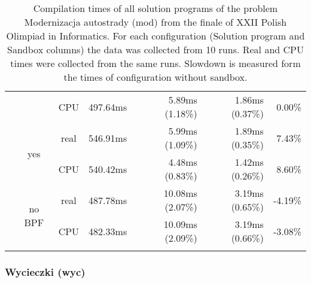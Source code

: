 \documentclass[en]{pracamgr}
\begin{document}
\begin{small}
\begin{longtable}{|l|c|c|r|r|r|r|}
                            &                         & CPU  & 497.64ms & 5.89ms (1.18\%) & 1.86ms (0.37\%) & 0.00\% \\*
                            \cline{2-7}
                            & \multirow{2}{*}{yes}    & real & 546.91ms & 5.99ms (1.09\%) & 1.89ms (0.35\%) & 7.43\% \\*
                            &                         & CPU  & 540.42ms & 4.48ms (0.83\%) & 1.42ms (0.26\%) & 8.60\% \\*
                            \cline{2-7}
                            & \multirow{2}{*}{no BPF} & real & 487.78ms & 10.08ms (2.07\%) & 3.19ms (0.65\%) & -4.19\% \\*
                            &                         & CPU  & 482.33ms & 10.09ms (2.09\%) & 3.19ms (0.66\%) & -3.08\% \\
\hline
\caption{Compilation times of all solution programs of the problem Modernizacja autostrady (mod) from the finale of XXII Polish Olimpiad in Informatics. For each configuration (Solution program and Sandbox columns) the data was collected from 10 runs. Real and CPU times were collected from the same runs. Slowdown is measured form the times of configuration without sandbox.}
\label{table:mod_compilation}
\end{longtable}
\end{small}

\subsubsection{Wycieczki (wyc)}
\end{document}
